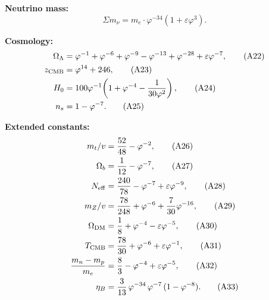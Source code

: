 \documentclass[aps,prd,twocolumn,superscriptaddress,nofootinbib,showpacs]{revtex4-2}
\newcommand{\Oml}{\Omega_\Lambda}
\newcommand{\Omb}{\Omega_b}
\newcommand{\Omdm}{\Omega_{\rm DM}}
\newcommand{\ns}{n_s}
\newcommand{\Neff}{N_{\rm eff}}
\newcommand{\TCMB}{T_{\rm CMB}}
\newcommand{\zcmb}{z_{\rm CMB}}
\begin{document}
\textbf{Neutrino mass:}
\begin{equation}
\Sigma m_\nu = m_e \cdot \varphi^{-34}(1+\varepsilon\varphi^3).
\tag{A21}\label{eq:A21}
\end{equation}

\textbf{Cosmology:}
\begin{align}
\Oml &= \varphi^{-1}+\varphi^{-6}+\varphi^{-9}-\varphi^{-13}
+\varphi^{-28}+\varepsilon\varphi^{-7},
\tag{A22}\label{eq:A22} \\
\zcmb &= \varphi^{14} + 246,
\tag{A23}\label{eq:A23} \\
H_0 &= 100\varphi^{-1}\!\left(1+\varphi^{-4}-\frac{1}{30\varphi^2}\right),
\tag{A24}\label{eq:A24} \\
\ns &= 1 - \varphi^{-7}.
\tag{A25}\label{eq:A25}
\end{align}

\textbf{Extended constants:}
\begin{align}
m_t/v &= \frac{52}{48} - \varphi^{-2},
\tag{A26}\label{eq:A26} \\
\Omb &= \frac{1}{12} - \varphi^{-7},
\tag{A27}\label{eq:A27} \\
\Neff &= \frac{240}{78} - \varphi^{-7} + \varepsilon\varphi^{-9},
\tag{A28}\label{eq:A28} \\
m_Z/v &= \frac{78}{248} + \varphi^{-6} + \frac{7}{30}\varphi^{-16},
\tag{A29}\label{eq:A29} \\
\Omdm &= \frac{1}{8} + \varphi^{-4} - \varepsilon\varphi^{-5},
\tag{A30}\label{eq:A30} \\
\TCMB &= \frac{78}{30} + \varphi^{-6} + \varepsilon\varphi^{-1},
\tag{A31}\label{eq:A31} \\
\frac{m_n-m_p}{m_e} &= \frac{8}{3} - \varphi^{-4} + \varepsilon\varphi^{-5},
\tag{A32}\label{eq:A32} \\
\eta_B &= \frac{3}{13}\,\varphi^{-34}\,\varphi^{-7}\,(1-\varphi^{-8}).
\tag{A33}\label{eq:A33}
\end{align}
\end{document}
